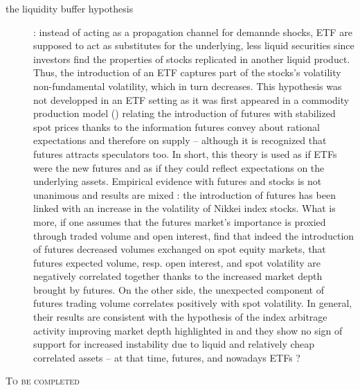 \begin{description}
  \item[the liquidity buffer hypothesis]: instead of acting as a propagation channel for demannde shocks, ETF are supposed to act as substitutes for the underlying, less liquid securities since investors find the properties of stocks replicated in another liquid product. Thus, the introduction of an ETF captures part of the stocks's volatility non-fundamental volatility, which in turn decreases. This hypothesis was not developped in an ETF setting as it was first appeared in a commodity production model (\cite{Danthine1978}) relating the introduction of futures with stabilized spot prices thanks to the information futures convey about rational expectations and therefore on supply -- although it is recognized that futures attracts speculators too. In short, this theory is used as if ETFs were the new futures and as if they could reflect expectations on the underlying assets. Empirical evidence with futures and stocks is not unanimous and results are mixed : the introduction of futures has been linked with an increase in the volatility of Nikkei index stocks. What is more, if one assumes that the futures market's importance is proxied through traded volume and open interest, \cite{Bessembinder1992} find that indeed the introduction of futures decreased volumes exchanged on spot equity markets, that futures expected volume, resp. open interest, and spot volatility are negatively correlated together thanks to the increased market depth brought by futures. On the other side, the unexpected component of futures trading volume correlates positively with spot volatility. In general, their results are consistent with the hypothesis of the index arbitrage activity improving market depth highlighted in \cite{Grossman1988} and they show no sign of support for increased instability due to liquid and relatively cheap correlated assets -- at that time, futures, and nowadays ETFs ?  
\end{description}

\begin{center}
  \textsc{To be completed}
  \end{center}
